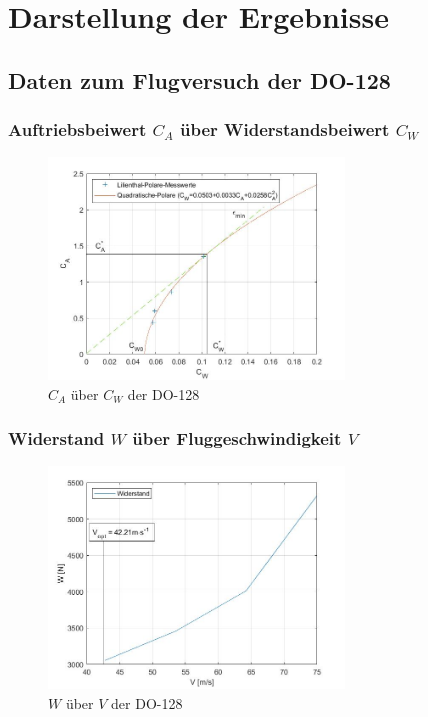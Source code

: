 \chapter{Darstellung der Ergebnisse}
\label{c:Ergebnisse}

\section{Daten zum Flugversuch der DO-128}

\subsection{Auftriebsbeiwert $C_A$ über Widerstandsbeiwert $C_{W}$}

\begin{figure}[H]
	\centering	\includegraphics[width=0.7\textwidth]{./Bilder/CA_CW_DO128_NEU.jpg}
	\caption{$C_{A}$ über $C_{W}$ der DO-128}
	\label{fig:CA_CW_DO128}
\end{figure}

\subsection{Widerstand $W$ über Fluggeschwindigkeit $V$}
\label{ss:W_V}

\begin{figure}[H]
	\centering	\includegraphics[width=0.7\textwidth]{./Bilder/W_V_DO128_NEU.jpg}
	\caption{$W$ über $V$ der DO-128}
	\label{fig:W_V_DO128}
\end{figure}

